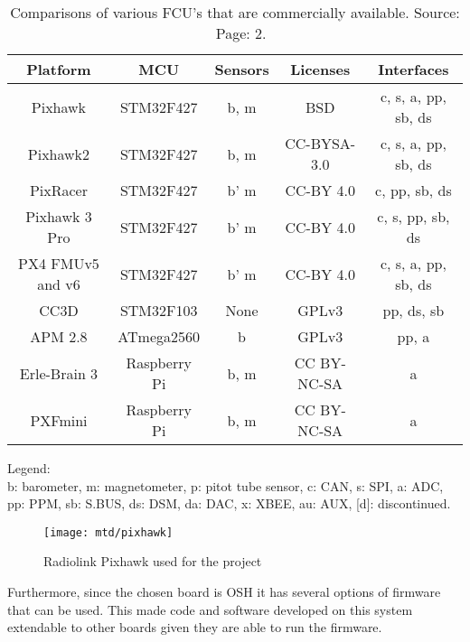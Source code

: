 \begin{table}[h!]
    \centering
    \begin{tabular}{|c | c | c | c | c|}
        \hline
        Platform & MCU & Sensors & Licenses & Interfaces\\
        \hline
        Pixhawk & STM32F427 & b, m & BSD & c, s, a, pp, sb, ds\\

        Pixhawk2 & STM32F427 & b, m & CC-BYSA-3.0 & c, s, a, pp, sb, ds\\

        PixRacer & STM32F427 & b' m & CC-BY 4.0 & c, pp, sb, ds \\

        Pixhawk 3 Pro & STM32F427 & b' m & CC-BY 4.0 & c, s, pp, sb, ds \\

        PX4 FMUv5 and v6 & STM32F427 & b' m & CC-BY 4.0 & c, s, a, pp, sb, ds \\

        CC3D & STM32F103 & None & GPLv3 & pp, ds, sb\\

        APM 2.8 & ATmega2560 & b & GPLv3 & pp, a\\

        Erle-Brain 3 & Raspberry Pi & b, m & CC BY-NC-SA &  a\\

        PXFmini & Raspberry Pi & b, m & CC BY-NC-SA & a\\
        \hline
    \end{tabular}
    \caption{Comparisons of various FCU's that are commercially available.
    Source: ~\citet{ebeid2018survey} Page: 2.}
    \label{tb:comparison}

    Legend:\\
b: barometer, m: magnetometer, p: pitot tube sensor, c: CAN, s: SPI, a: ADC, pp:
PPM, sb: S.BUS, ds: DSM, da: DAC, x: XBEE, au: AUX, [d]: discontinued.
\end{table}

\begin{figure}[ht!]
    \centering
    \texttt{[image: mtd/pixhawk]}
    \caption{Radiolink Pixhawk used for the project}
    \label{fig:pix}
\end{figure}

Furthermore, since the chosen board is OSH it has several options of firmware that can be used.
This made code and software developed on this system extendable to other boards given they are able to run the firmware.
\newpage

